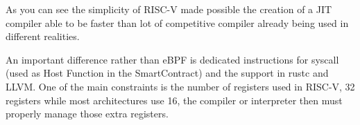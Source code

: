 As you can see the simplicity of RISC-V made possible the creation of a JIT compiler able to be faster than lot of competitive compiler already being used in different realities.

An important difference rather than eBPF is dedicated instructions for syscall (used as Host Function in the SmartContract) and the support in rustc and LLVM. One of the main constraints is the number of registers used in RISC-V, 32 registers while most architectures use 16, the compiler or interpreter then must properly manage those extra registers.
